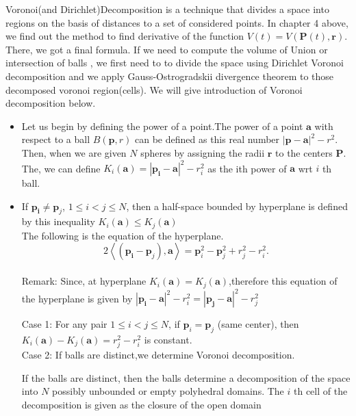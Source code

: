 Voronoi(and Dirichlet)Decomposition  is a technique that divides a space into regions on the basis  of distances to a set of considered points. In chapter 4 above, we find out the method to find derivative of the function $V(t)=V(\mathbf{P}(t), \mathbf{r})$. There, we got a final formula. If we need to compute the volume of Union or intersection of balls , we first need to to divide the space using Dirichlet Voronoi decomposition and we apply Gauss-Ostrogradskii divergence theorem to those decomposed voronoi region(cells).
We will give introduction of Voronoi decomposition below.\\

\begin{itemize}


    \item Let us begin by defining the power of a point.The power of a point $\mathbf{a}$ with respect to a ball $B(\mathbf{p}, r)$ can be defined as this real number $|\mathbf{p}-\mathbf{a}|^{2}-r^{2}$. Then, when we are given  $N$ spheres by assigning the radii $\mathbf{r}$ to the centers $\mathbf{P}$. The, we can define $K_{i}(\mathbf{a})=\left|\mathbf{p}_{\mathbf{i}}-\mathbf{a}\right|^{2}-r_{i}^{2}$ as the ith  power of $\mathbf{a}$ wrt $i$ th ball. 


    
    \item  
    If $\mathbf{p}_{\mathbf{i}} \neq \mathbf{p}_{j}$,  $1 \leq i<j \leq N$, then  a half-space bounded by hyperplane is defined by this inequality $K_{i}(\mathbf{a}) \leq K_{j}(\mathbf{a})$\\ 
    The following  is the equation of the hyperplane. 
    $$
2\left\langle\left(\mathbf{p}_{\mathbf{i}}-\mathbf{p}_{j}\right), \mathbf{a}\right\rangle=\mathbf{p}_{i}^{2}-\mathbf{p}_{j}^{2}+r_{j}^{2}-r_{i}^{2} .
$$\\
Remark: Since, at hyperplane $K_{i}(\mathbf{a})=K_{j}(\mathbf{a})$,therefore this equation of the hyperplane is given by $\left|\mathbf{p}_{\mathbf{i}}-\mathbf{a}\right|^{2}-r_{i}^{2}=\left|\mathbf{p}_{\mathbf{j}}-\mathbf{a}\right|^{2}-r_{j}^{2}$


Case 1: For any pair $1 \leq i<j \leq N$, if $\mathbf{p}_{i}=\mathbf{p}_{j}$ (same center), then $K_{i}(\mathbf{a})-K_{j}(\mathbf{a})=r_{j}^{2}-r_{i}^{2}$ is constant.\\
Case 2: If balls are distinct,we determine Voronoi decomposition.


If the balls are distinct, then the balls determine a decomposition of the space into $N$ possibly unbounded or empty polyhedral domains. The $i$ th cell of the decomposition is given as the closure of the open domain
















\end{itemize}
